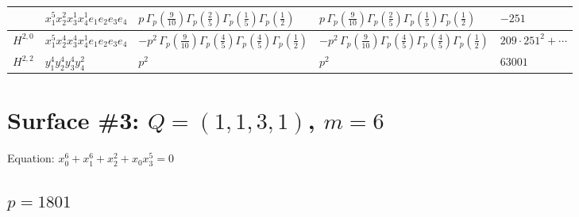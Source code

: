 \documentclass[11pt]{article}
\begin{document}
\begin{table}[ht]
{\begin{tabular}{@{}lllll@{}}
 & $x_{1}^{5} x_{2}^{2} x_{3}^{1} x_{4}^{1}  e_{1} e_{2} e_{3} e_{4}$ & $p \, \Gamma_p \left( \frac{9}{10} \right) \Gamma_p \left( \frac{2}{5} \right) \Gamma_p \left( \frac{1}{5} \right) \Gamma_p \left( \frac{1}{2} \right)$ & $p \, \Gamma_p \left( \frac{9}{10} \right) \Gamma_p \left( \frac{2}{5} \right) \Gamma_p \left( \frac{1}{5} \right) \Gamma_p \left( \frac{1}{2} \right)$ & $-251$ \\
\midrule
$H^{2,0}$ & $x_{1}^{5} x_{2}^{4} x_{3}^{4} x_{4}^{1}  e_{1} e_{2} e_{3} e_{4}$ & $- p^{2} \, \Gamma_p \left( \frac{9}{10} \right) \Gamma_p \left( \frac{4}{5} \right) \Gamma_p \left( \frac{4}{5} \right) \Gamma_p \left( \frac{1}{2} \right)$ & $- p^{2} \, \Gamma_p \left( \frac{9}{10} \right) \Gamma_p \left( \frac{4}{5} \right) \Gamma_p \left( \frac{4}{5} \right) \Gamma_p \left( \frac{1}{2} \right)$ & $209{\cdot}251^{2}{+}\cdots$ \\
\midrule
$H^{2,2}$ & $y_{1}^{4} y_{2}^{4} y_{3}^{4} y_{4}^{2}$ & $p^{2} \,$ & $p^{2} \,$ & $63001$ \\
\bottomrule
\end{tabular}
}
\renewcommand{\arraystretch}{1.0}
\end{table}

\newpage

\section*{Surface \#3: $Q=(1, 1, 3, 1)$, $m=6$}

Equation: $x_0^{6} + x_1^{6} + x_2^{2} + x_0 x_3^{5} = 0$

\subsection*{$p = 1801$}
\end{document}
